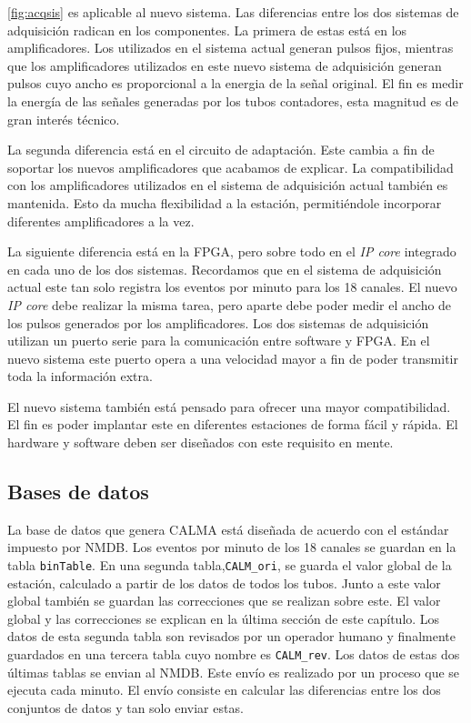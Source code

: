 		\ref{fig:acqsis} es aplicable al nuevo sistema. Las diferencias entre los dos sistemas de adquisición radican en los componentes. La
		primera de estas está en los amplificadores. Los utilizados en el sistema actual generan pulsos fijos, mientras que los amplificadores
		utilizados en este nuevo sistema de adquisición generan pulsos cuyo ancho es proporcional a la energia de la señal original. El fin es
		medir la energía de las señales generadas por los tubos contadores, esta magnitud es de gran interés técnico.
		\par
		La segunda diferencia está en el circuito de adaptación. Este cambia a fin de soportar los nuevos amplificadores que acabamos de
		explicar. La compatibilidad con los amplificadores utilizados en el sistema de adquisición actual también es mantenida. Esto da mucha
		flexibilidad a la estación, permitiéndole incorporar diferentes amplificadores a la vez.
		\par
		La siguiente diferencia está en la FPGA, pero sobre todo en el \emph{IP core} integrado en cada uno de los dos sistemas. Recordamos
		que en el sistema de adquisición actual este tan solo registra los eventos por minuto para los 18 canales. El nuevo \emph{IP core}
		debe realizar la misma tarea, pero aparte debe poder medir el ancho de los pulsos generados por los amplificadores. Los dos sistemas
		de adquisición utilizan un puerto serie para la comunicación entre software y FPGA. En el nuevo sistema este puerto opera a una
		velocidad mayor a fin de poder transmitir toda la información extra.
		\par
		El nuevo sistema también está pensado para ofrecer una mayor compatibilidad. El fin es poder implantar este en diferentes estaciones
		de forma fácil y rápida. El hardware y software deben ser diseñados con este requisito en mente.
	\subsection{Bases de datos}
		La base de datos que genera CALMA está diseñada de acuerdo con el estándar impuesto por NMDB. Los eventos por minuto de los 18 canales
		se guardan en la tabla \texttt{binTable}. En una segunda tabla,\texttt{CALM\_ori}, se guarda el valor global de la estación, calculado
		a partir de los datos de todos los tubos. Junto a este valor global también se guardan las correcciones que se realizan sobre este. El
		valor global y las correcciones se explican en la última sección de este capítulo. Los datos de esta segunda tabla son revisados
		por un operador humano y finalmente guardados en una tercera tabla cuyo nombre es \texttt{CALM\_rev}. Los datos de estas dos últimas
		tablas se envian al NMDB. Este envío es realizado por un proceso que se ejecuta cada minuto. El envío consiste en calcular las
		diferencias entre los dos conjuntos de datos y tan solo enviar estas.
